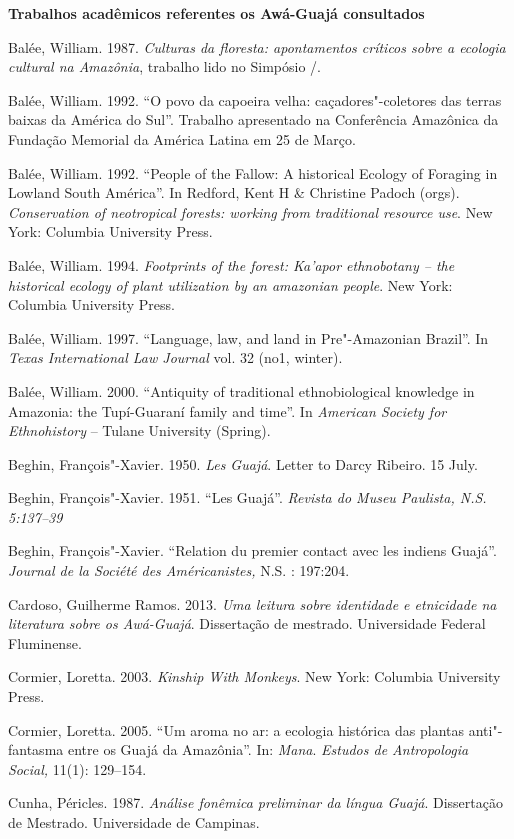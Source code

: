 \textbf{Trabalhos acadêmicos referentes os Awá-Guajá consultados}

Balée, William. 1987. \emph{Culturas da floresta: apontamentos críticos
sobre a ecologia cultural na Amazônia}, trabalho lido no Simpósio
/.

Balée, William. 1992. ``O povo da capoeira velha: caçadores"-coletores
das terras baixas da América do Sul''. Trabalho apresentado na
Conferência Amazônica da Fundação Memorial da América Latina em 25 de
Março.

Balée, William. 1992. ``People of the Fallow: A historical Ecology of
Foraging in Lowland South América''. In Redford, Kent H \& Christine
Padoch (orgs). \emph{Conservation of neotropical forests: working from
traditional resource use}. New York: Columbia University Press.

Balée, William. 1994. \emph{Footprints of the forest: Ka'apor
ethnobotany -- the historical ecology of plant utilization by an
amazonian people}. New York: Columbia University Press.

Balée, William. 1997. ``Language, law, and land in Pre"-Amazonian
Brazil''. In \emph{Texas International Law Journal} vol. 32 (no1,
winter).

Balée, William. 2000. ``Antiquity of traditional ethnobiological
knowledge in Amazonia: the Tupí-Guaraní family and time''. In
\emph{American Society for Ethnohistory} -- Tulane University (Spring).

Beghin, François"-Xavier. 1950. \emph{Les Guajá}. Letter to Darcy
Ribeiro. 15 July.

Beghin, François"-Xavier. 1951. ``Les Guajá''. \emph{Revista do Museu
Paulista, N.S. 5:137--39}

Beghin, François"-Xavier. ``Relation du premier contact avec les indiens
Guajá''. \emph{Journal de la Société des Américanistes,} N.S. :
197:204.

Cardoso, Guilherme Ramos. 2013. \emph{Uma leitura sobre identidade e
etnicidade na literatura sobre os Awá-Guajá}. Dissertação de mestrado.
Universidade Federal Fluminense.

Cormier, Loretta. 2003. \emph{Kinship With Monkeys}. New York: Columbia
University Press.

Cormier, Loretta. 2005. ``Um aroma no ar: a ecologia histórica das
plantas anti"-fantasma entre os Guajá da Amazônia''. In: \emph{Mana}.
\emph{Estudos de Antropologia Social,} 11(1): 129--154.

Cunha, Péricles. 1987. \emph{Análise fonêmica preliminar da língua
Guajá}. Dissertação de Mestrado. Universidade de Campinas.

